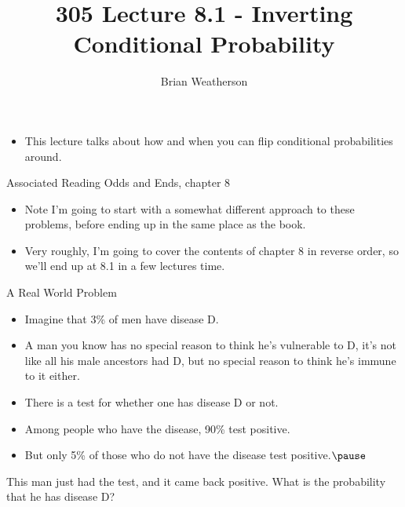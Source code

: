 \documentclass[
  ignorenonframetext,
]{beamer}
\title{305 Lecture 8.1 - Inverting Conditional Probability}
\author{Brian Weatherson}
\date{}
\providecommand{\tightlist}{%
  \setlength{\itemsep}{0pt}\setlength{\parskip}{0pt}}
\renewcommand{\,}{\text{, }}
\begin{document}
\frame{\titlepage}

\begin{frame}
\begin{itemize}
\tightlist
\item
  This lecture talks about how and when you can flip conditional
  probabilities around.
\end{itemize}
\end{frame}

\begin{frame}{Associated Reading}
\protect\hypertarget{associated-reading}{}
Odds and Ends, chapter 8

\begin{itemize}
\tightlist
\item
  Note I'm going to start with a somewhat different approach to these
  problems, before ending up in the same place as the book.
\item
  Very roughly, I'm going to cover the contents of chapter 8 in reverse
  order, so we'll end up at 8.1 in a few lectures time.
\end{itemize}
\end{frame}

\begin{frame}{A Real World Problem}
\protect\hypertarget{a-real-world-problem}{}
\begin{itemize}
\tightlist
\item
  Imagine that 3\% of men have disease D.
\item
  A man you know has no special reason to think he's vulnerable to D,
  it's not like all his male ancestors had D, but no special reason to
  think he's immune to it either.
\item
  There is a test for whether one has disease D or not.
\item
  Among people who have the disease, 90\% test positive.
\item
  But only 5\% of those who do not have the disease test
  positive.\(\pause\)
\end{itemize}

This man just had the test, and it came back positive. What is the
probability that he has disease D?
\end{frame}
\end{document}
